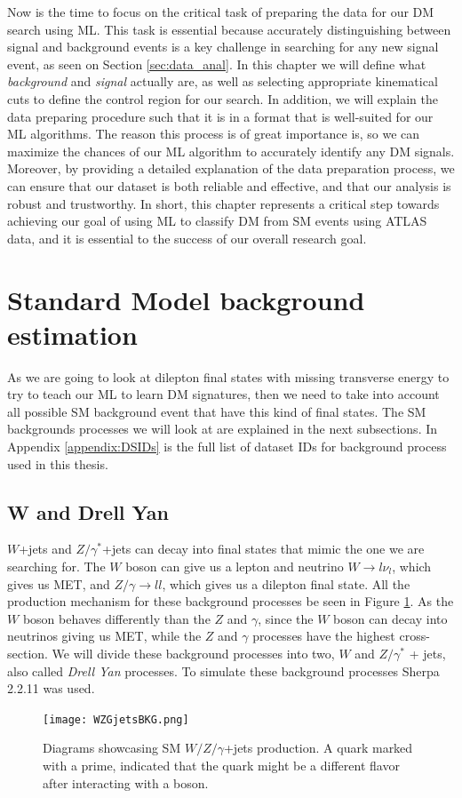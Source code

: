 \documentclass[12pt, a4paper]{book}
\begin{document}
Now is the time to focus on the critical task of preparing the data for our DM search using ML. This task is essential because accurately distinguishing between signal and background events is a key challenge in searching for any new signal event, 
as seen on Section \ref{sec:data_anal}. In this chapter we will define what \textit{background} and \textit{signal} actually are, as well as selecting appropriate kinematical cuts to define the control region for our search. In addition, we will 
explain the data preparing procedure such that it is in a format that is well-suited for our ML algorithms. The reason this process is of great importance is, so we can maximize the chances of our ML algorithm to accurately identify any DM signals. 
Moreover, by providing a detailed explanation of the data preparation process, we can ensure that our dataset is both reliable and effective, and that our analysis is robust and trustworthy. In short, this chapter represents a critical step towards 
achieving our goal of using ML to classify DM from SM events using ATLAS data, and it is essential to the success of our overall research goal.



\clearpage
\section{Standard Model background estimation}
As we are going to look at dilepton final states with missing transverse energy to try to teach our ML to learn DM signatures, then we need to take into account all possible SM background event that have this kind of final states. The SM backgrounds processes we will look at are explained in the next subsections. 
In Appendix \ref{appendix:DSIDs} is the full list of dataset IDs for background process used in this thesis.

\subsection{W and Drell Yan}
$W$+jets and $Z/\gamma^*$+jets can decay into final states that mimic the one we are searching for. The $W$ boson can give us a lepton and neutrino $W\rightarrow l\nu_l$, which gives us MET, and $Z/\gamma\rightarrow ll$, which gives us a dilepton final state. 
All the production mechanism for these background processes be seen in Figure \ref{fig:WZG_BKG}. As the $W$ boson behaves differently than the $Z$ and $\gamma$, since the $W$ boson can decay into neutrinos giving us MET, while the $Z$ and $\gamma$ processes have the highest cross-section. 
We will divide  these background processes into two, $W$ and $Z/\gamma^*$ + jets, also called \textit{Drell Yan} processes. To simulate these background processes Sherpa 2.2.11 \cite{Sherpa} was used.
\graphicspath{{../../figures/}}
\begin{figure}[!ht]
    \centering
    \texttt{[image: WZGjetsBKG.png]}
    \caption[$W/Z/\gamma$+jets production]{Diagrams showcasing SM $W/Z/\gamma$+jets production. A quark marked with a prime, indicated that the quark might be a different flavor after interacting with a boson.}\label{fig:WZG_BKG}
\end{figure}
\end{document}
